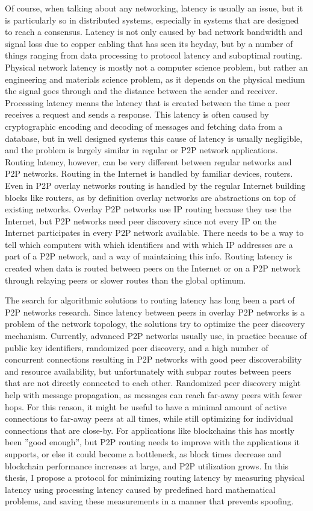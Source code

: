 Of course, when talking about any networking, latency is usually an issue, but it is particularly so in distributed systems, especially in systems that are designed to reach a consensus. Latency is not only caused by bad network bandwidth and signal loss due to copper cabling that has seen its heyday, but by a number of things ranging from data processing to protocol latency and suboptimal routing. Physical network latency is mostly not a computer science problem, but rather an engineering and materials science problem, as it depends on the physical medium the signal goes through and the distance between the sender and receiver. Processing latency means the latency that is created between the time a peer receives a request and sends a response. This latency is often caused by cryptographic encoding and decoding of messages and fetching data from a database, but in well designed systems this cause of latency is usually negligible, and the problem is largely similar in regular or P2P network applications. Routing latency, however, can be very different between regular networks and P2P networks. Routing in the Internet is handled by familiar devices, routers. Even in P2P overlay networks routing is handled by the regular Internet building blocks like routers, as by definition overlay networks are abstractions on top of existing networks. Overlay P2P networks use IP routing because they use the Internet, but P2P networks need peer discovery since not every IP on the Internet participates in every P2P network available. There needs to be a way to tell which computers with which identifiers and with which IP addresses are a part of a P2P network, and a way of maintaining this info. Routing latency is created when data is routed between peers on the Internet or on a P2P network through relaying peers or slower routes than the global optimum.

The search for algorithmic solutions to routing latency has long been a part of P2P networks research. Since latency between peers in overlay P2P networks is a problem of the network topology, the solutions try to optimize the peer discovery mechanism. Currently, advanced P2P networks usually use, in practice because of public key identifiers, randomized peer discovery, and a high number of concurrent connections resulting in P2P networks with good peer discoverability and resource availability, but unfortunately with subpar routes between peers that are not directly connected to each other. Randomized peer discovery might help with message propagation, as messages can reach far-away peers with fewer hops. For this reason, it might be useful to have a minimal amount of active connections to far-away peers at all times, while still optimizing for individual connections that are close-by. For applications like blockchains this has mostly been ''good enough'', but P2P routing needs to improve with the applications it supports, or else it could become a bottleneck, as block times decrease and blockchain performance increases at large, and P2P utilization grows. In this thesis, I propose a protocol for minimizing routing latency by measuring physical latency using processing latency caused by predefined hard mathematical problems, and saving these measurements in a manner that prevents spoofing.

